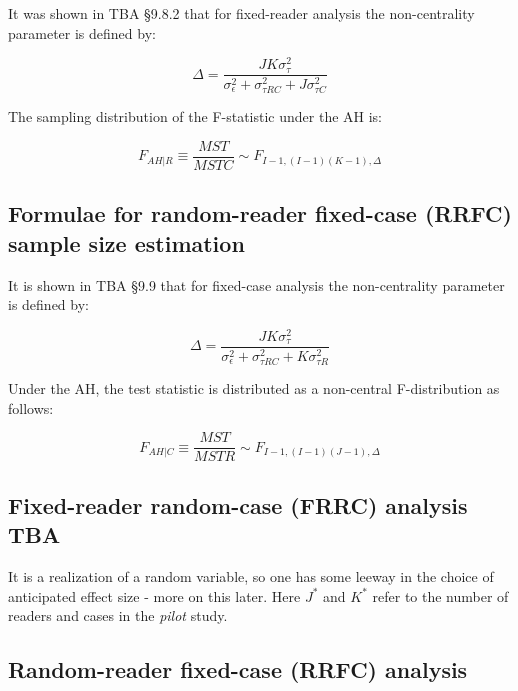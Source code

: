 \documentclass[
]{book}
\begin{document}
It was shown in TBA §9.8.2 that for fixed-reader analysis the non-centrality parameter is defined by:

\begin{equation}
\Delta=\frac{JK\sigma_{\tau}^2}{\sigma_{\epsilon}^2+\sigma_{\tau RC}^2+J\sigma_{\tau C}^2}
\label{eq:DeltaFRRC}
\end{equation}

The sampling distribution of the F-statistic under the AH is:

\begin{equation}
F_{AH|R}\equiv \frac{MST}{MSTC}\sim F_{I-1,(I-1)(K-1),\Delta}
\label{eq:SamplingFFRRC}
\end{equation}

\hypertarget{RocSampleSizeDBM-RRFC-sample-size-estimation}{%
\subsection{Formulae for random-reader fixed-case (RRFC) sample size estimation}\label{RocSampleSizeDBM-RRFC-sample-size-estimation}}

It is shown in TBA §9.9 that for fixed-case analysis the non-centrality parameter is defined by:

\begin{equation}
\Delta=\frac{JK\sigma_{\tau}^2}{\sigma_{\epsilon}^2+\sigma_{\tau RC}^2+K\sigma_{\tau R}^2}
\label{eq:DeltaFRRFC}
\end{equation}

Under the AH, the test statistic is distributed as a non-central F-distribution as follows:

\begin{equation}
F_{AH|C}\equiv \frac{MST}{MSTR}\sim F_{I-1,(I-1)(J-1),\Delta}
\label{eq:SamplingFRRFC}
\end{equation}

\hypertarget{RocSampleSizeDBM-FRRCAnalysis}{%
\subsection{Fixed-reader random-case (FRRC) analysis TBA}\label{RocSampleSizeDBM-FRRCAnalysis}}

It is a realization of a random variable, so one has some leeway in the choice of anticipated effect size - more on this later.
Here \(J^*\) and \(K^*\) refer to the number of readers and cases in the \emph{pilot} study.

\hypertarget{RocSampleSizeDBM-RRFCAnalysis}{%
\subsection{Random-reader fixed-case (RRFC) analysis}\label{RocSampleSizeDBM-RRFCAnalysis}}
\end{document}
